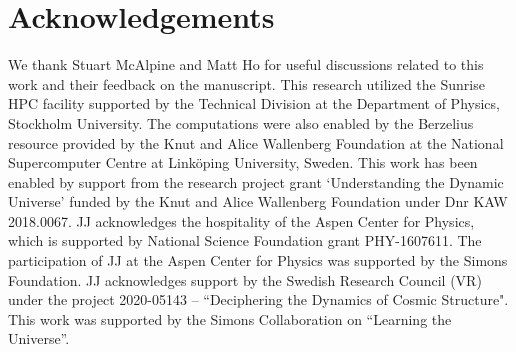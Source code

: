 \section*{Acknowledgements}
We thank Stuart McAlpine and Matt Ho for useful discussions related to this work and their feedback on the manuscript. This research utilized the Sunrise HPC facility supported by the Technical Division at the Department of Physics, Stockholm University. The computations were also enabled by the Berzelius resource provided by the Knut and Alice Wallenberg Foundation at the National Supercomputer Centre at Linköping University, Sweden. This work has been enabled by support from the research project grant ‘Understanding the Dynamic Universe’ funded by the Knut and Alice Wallenberg Foundation under Dnr KAW 2018.0067. JJ acknowledges the hospitality of the Aspen Center for Physics, which is supported by National Science Foundation grant PHY-1607611. The participation of JJ at the Aspen Center for Physics was supported by the Simons Foundation. JJ acknowledges support by the Swedish Research Council (VR) under the project 2020-05143 -- ``Deciphering the Dynamics of Cosmic Structure". This work was supported by the Simons Collaboration on “Learning the Universe”. 
\vspace{-1em}